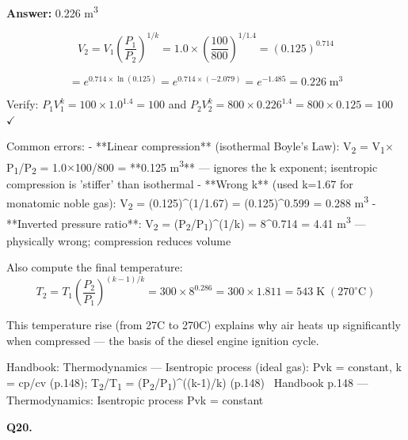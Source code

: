 \documentclass[11pt]{article}
\begin{document}
\vspace{2pt}\par\noindent\colorbox{boxbg}{\parbox{\dimexpr\linewidth-2\fboxsep\relax}{%
\vspace{2pt}\textbf{Answer:} 0.226 m\textsuperscript{3}\par\vspace{2pt}
{\small \[V_2 = V_1 \left(\frac{P_1}{P_2}\right)^{1/k} = 1.0 \times \left(\frac{100}{800}\right)^{1/1.4} = (0.125)^{0.714}\]

\[= e^{0.714 \times \ln(0.125)} = e^{0.714 \times (-2.079)} = e^{-1.485} = 0.226\;\text{m}^3\]

Verify: $P_1 V_1^k = 100 \times 1.0^{1.4} = 100$ and $P_2 V_2^k = 800 \times 0.226^{1.4} = 800 \times 0.125 = 100$ $\checkmark$

Common errors:
- **Linear compression** (isothermal Boyle's Law): V\textsubscript{2} = V\textsubscript{1}$\times$P\textsubscript{1}/P\textsubscript{2} = 1.0$\times$100/800 = **0.125 m\textsuperscript{3}** --- ignores the k exponent; isentropic compression is 'stiffer' than isothermal
- **Wrong k** (used k=1.67 for monatomic noble gas): V\textsubscript{2} = (0.125)\textasciicircum{}(1/1.67) = (0.125)\textasciicircum{}0.599 = 0.288 m\textsuperscript{3}
- **Inverted pressure ratio**: V\textsubscript{2} = (P\textsubscript{2}/P\textsubscript{1})\textasciicircum{}(1/k) = 8\textasciicircum{}0.714 = 4.41 m\textsuperscript{3} --- physically wrong; compression reduces volume

Also compute the final temperature:
\[T_2 = T_1 \left(\frac{P_2}{P_1}\right)^{(k-1)/k} = 300 \times 8^{0.286} = 300 \times 1.811 = 543\;\text{K}\;(270^{\circ}\text{C})\]

This temperature rise (from 27\textdegree{}C to 270\textdegree{}C) explains why air heats up significantly when compressed --- the basis of the diesel engine ignition cycle.}\par\vspace{2pt}
{\footnotesize\color{soft}Handbook: Thermodynamics --- Isentropic process (ideal gas): Pvk = constant, k = cp/cv (p.148); T\textsubscript{2}/T\textsubscript{1} = (P\textsubscript{2}/P\textsubscript{1})\textasciicircum{}((k-1)/k) (p.148) \textbullet\ Handbook p.148 --- Thermodynamics: Isentropic process Pvk = constant}\vspace{2pt}
}}
\vspace{9pt}
\filbreak
\textbf{\color{accent}Q20.}\par\vspace{2pt}
\end{document}
